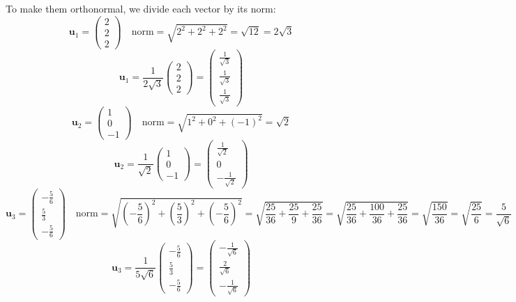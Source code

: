 \documentclass[a3paper,12pt]{extarticle} %
\begin{document}
\begin{enumerate}
\begin{enumerate}
\[        \]
        To make them orthonormal, we divide each vector by its norm:
        \[
            \mathbf{u}_1 = \begin{pmatrix} 2 \\ 2 \\ 2 \end{pmatrix} \quad \text{norm} = \sqrt{2^2 + 2^2 + 2^2} = \sqrt{12} = 2\sqrt{3}
        \]
        \[
            \mathbf{u}_1 = \frac{1}{2\sqrt{3}} \begin{pmatrix} 2 \\ 2 \\ 2 \end{pmatrix} = \begin{pmatrix} \frac{1}{\sqrt{3}} \\ \frac{1}{\sqrt{3}} \\ \frac{1}{\sqrt{3}} \end{pmatrix}
        \]
        \[
            \mathbf{u}_2 = \begin{pmatrix} 1 \\ 0 \\ -1 \end{pmatrix} \quad \text{norm} = \sqrt{1^2 + 0^2 + (-1)^2} = \sqrt{2}
        \]
        \[
            \mathbf{u}_2 = \frac{1}{\sqrt{2}} \begin{pmatrix} 1 \\ 0 \\ -1 \end{pmatrix} = \begin{pmatrix} \frac{1}{\sqrt{2}} \\ 0 \\ -\frac{1}{\sqrt{2}} \end{pmatrix}
        \]
        \[
            \mathbf{u}_3 = \begin{pmatrix} -\frac{5}{6} \\ \frac{5}{3} \\ -\frac{5}{6} \end{pmatrix} \quad \text{norm} = \sqrt{\left( -\frac{5}{6} \right)^2 + \left( \frac{5}{3} \right)^2 + \left( -\frac{5}{6} \right)^2} = \sqrt{\frac{25}{36} + \frac{25}{9} + \frac{25}{36}} = \sqrt{\frac{25}{36} + \frac{100}{36} + \frac{25}{36}} = \sqrt{\frac{150}{36}} = \sqrt{\frac{25}{6}} = \frac{5}{\sqrt{6}}
        \]
        \[
            \mathbf{u}_3 = \frac{1}{5\sqrt{6}} \begin{pmatrix} -\frac{5}{6} \\ \frac{5}{3} \\ -\frac{5}{6} \end{pmatrix} = \begin{pmatrix} -\frac{1}{\sqrt{6}} \\ \frac{2}{\sqrt{6}} \\ -\frac{1}{\sqrt{6}} \end{pmatrix}
\]
\end{enumerate}
\end{enumerate}
\end{document}
